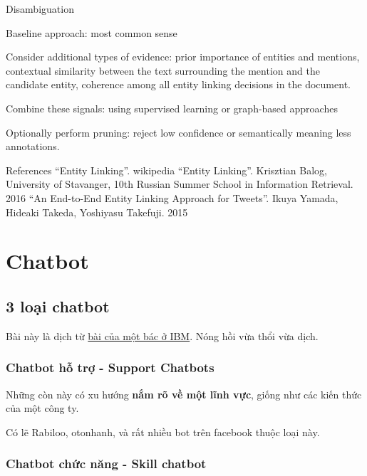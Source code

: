Disambiguation


Baseline approach: most common sense

Consider additional types of evidence: prior importance of entities and mentions, contextual similarity between the text surrounding the mention and the candidate entity, coherence among all entity linking decisions in the document.

Combine these signals: using supervised learning or graph-based approaches

Optionally perform pruning: reject low confidence or semantically meaning less annotations.

References
“Entity Linking”. wikipedia
“Entity Linking”. Krisztian Balog, University of Stavanger, 10th Russian Summer School in Information Retrieval. 2016
“An End-to-End Entity Linking Approach for Tweets”. Ikuya Yamada, Hideaki Takeda, Yoshiyasu Takefuji. 2015

\section{Chatbot}



\subsection{3 loại chatbot}

Bài này là dịch từ \href{https://www.ibm.com/blogs/watson/2017/12/3-types-of-business-chatbots-you-can-build/}{bài của một bác ở IBM}. Nóng hồi vừa thổi vừa dịch.

\subsubsection{Chatbot hỗ trợ - Support Chatbots}

Những còn này có xu hướng \textbf{nắm rõ về một lĩnh vực}, giống như các kiến thức của một công ty.

Có lẽ Rabiloo, otonhanh, và rất nhiều bot trên facebook thuộc loại này.

\subsubsection{Chatbot chức năng - Skill chatbot}

